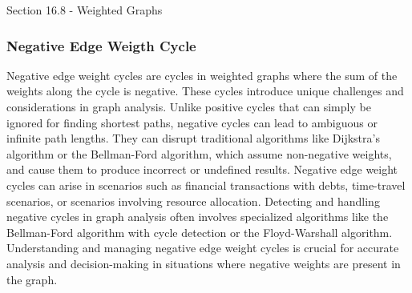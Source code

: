 \begin{notes}{Section 16.8 - Weighted Graphs}
    \subsubsection*{Negative Edge Weigth Cycle}
    
    Negative edge weight cycles are cycles in weighted graphs where the sum of the weights along the cycle is negative. These cycles introduce unique challenges and considerations in graph analysis. Unlike positive cycles 
    that can simply be ignored for finding shortest paths, negative cycles can lead to ambiguous or infinite path lengths. They can disrupt traditional algorithms like Dijkstra's algorithm or the Bellman-Ford algorithm, 
    which assume non-negative weights, and cause them to produce incorrect or undefined results. Negative edge weight cycles can arise in scenarios such as financial transactions with debts, time-travel scenarios, or scenarios 
    involving resource allocation. Detecting and handling negative cycles in graph analysis often involves specialized algorithms like the Bellman-Ford algorithm with cycle detection or the Floyd-Warshall algorithm. Understanding 
    and managing negative edge weight cycles is crucial for accurate analysis and decision-making in situations where negative weights are present in the graph.
\end{notes}

